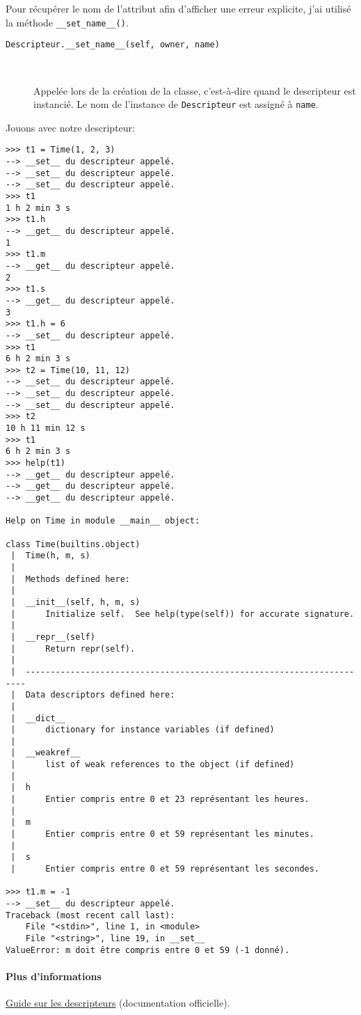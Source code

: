 Pour récupérer le nom de l'attribut afin d'afficher une erreur explicite, j'ai utilisé la méthode \texttt{__set_name__()}.

\begin{description}
    \item[\texttt{Descripteur.__set_name__(self, owner, name)}]~
    
    Appelée lors de la création de la classe, c'est-à-dire quand le descripteur est instancié. Le nom de l'instance de \texttt{Descripteur} est assigné à \texttt{name}.
\end{description}

Jouons avec notre descripteur:

\begin{verbatim}
>>> t1 = Time(1, 2, 3)
--> __set__ du descripteur appelé.
--> __set__ du descripteur appelé.
--> __set__ du descripteur appelé.
>>> t1
1 h 2 min 3 s
>>> t1.h
--> __get__ du descripteur appelé.
1
>>> t1.m
--> __get__ du descripteur appelé.
2
>>> t1.s
--> __get__ du descripteur appelé.
3
>>> t1.h = 6
--> __set__ du descripteur appelé.
>>> t1
6 h 2 min 3 s
>>> t2 = Time(10, 11, 12)
--> __set__ du descripteur appelé.
--> __set__ du descripteur appelé.
--> __set__ du descripteur appelé.
>>> t2
10 h 11 min 12 s
>>> t1
6 h 2 min 3 s
>>> help(t1)
--> __get__ du descripteur appelé.
--> __get__ du descripteur appelé.
--> __get__ du descripteur appelé.

Help on Time in module __main__ object:

class Time(builtins.object)
 |  Time(h, m, s)
 |  
 |  Methods defined here:
 |  
 |  __init__(self, h, m, s)
 |      Initialize self.  See help(type(self)) for accurate signature.
 |  
 |  __repr__(self)
 |      Return repr(self).
 |  
 |  ----------------------------------------------------------------------
 |  Data descriptors defined here:
 |  
 |  __dict__
 |      dictionary for instance variables (if defined)
 |  
 |  __weakref__
 |      list of weak references to the object (if defined)
 |  
 |  h
 |      Entier compris entre 0 et 23 représentant les heures.
 |  
 |  m
 |      Entier compris entre 0 et 59 représentant les minutes.
 |  
 |  s
 |      Entier compris entre 0 et 59 représentant les secondes.

>>> t1.m = -1
--> __set__ du descripteur appelé.
Traceback (most recent call last):
    File "<stdin>", line 1, in <module>
    File "<string>", line 19, in __set__
ValueError: m doit être compris entre 0 et 59 (-1 donné).
\end{verbatim}

\paragraph{Plus d'informations} \href{https://docs.python.org/fr/3/howto/descriptor.html}{Guide sur les descripteurs} (documentation officielle).
